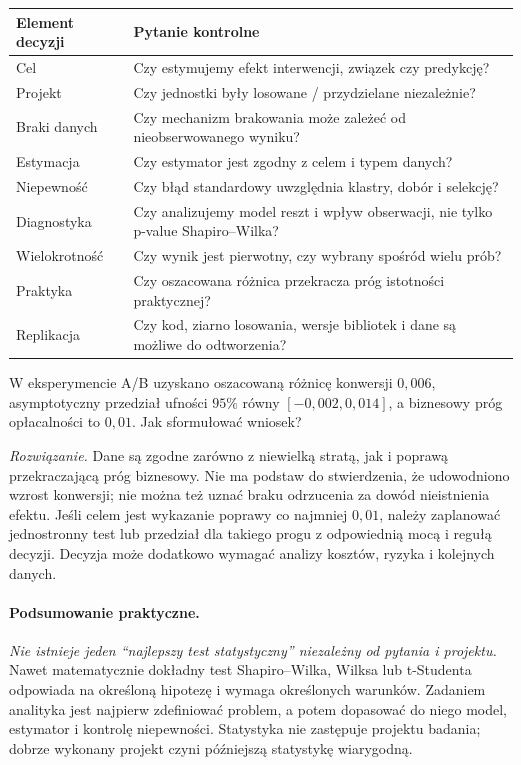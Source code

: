 \begin{center}\small
\begin{tabular}{>{\raggedright\arraybackslash}p{}>{\raggedright\arraybackslash}p{}}
\toprule
\textbf{Element decyzji} & \textbf{Pytanie kontrolne}\\
\midrule
Cel & Czy estymujemy efekt interwencji, związek czy predykcję?\\
Projekt & Czy jednostki były losowane / przydzielane niezależnie?\\
Braki danych & Czy mechanizm brakowania może zależeć od nieobserwowanego wyniku?\\
Estymacja & Czy estymator jest zgodny z celem i typem danych?\\
Niepewność & Czy błąd standardowy uwzględnia klastry, dobór i selekcję?\\
Diagnostyka & Czy analizujemy model reszt i wpływ obserwacji, nie tylko p-value Shapiro--Wilka?\\
Wielokrotność & Czy wynik jest pierwotny, czy wybrany spośród wielu prób?\\
Praktyka & Czy oszacowana różnica przekracza próg istotności praktycznej?\\
Replikacja & Czy kod, ziarno losowania, wersje bibliotek i dane są możliwe do odtworzenia?\\
\bottomrule
\end{tabular}
\end{center}

\begin{zadanie}
W eksperymencie A/B uzyskano oszacowaną różnicę konwersji $0{,}006$, asymptotyczny przedział ufności $95\%$ równy $[-0{,}002,0{,}014]$, a biznesowy próg opłacalności to $0{,}01$. Jak sformułować wniosek?\par
\emph{Rozwiązanie.} Dane są zgodne zarówno z niewielką stratą, jak i poprawą przekraczającą próg biznesowy. Nie ma podstaw do stwierdzenia, że udowodniono wzrost konwersji; nie można też uznać braku odrzucenia za dowód nieistnienia efektu. Jeśli celem jest wykazanie poprawy co najmniej $0{,}01$, należy zaplanować jednostronny test lub przedział dla takiego progu z odpowiednią mocą i regułą decyzji. Decyzja może dodatkowo wymagać analizy kosztów, ryzyka i kolejnych danych.
\end{zadanie}

\paragraph{Podsumowanie praktyczne.}
\emph{Nie istnieje jeden ``najlepszy test statystyczny'' niezależny od pytania i projektu.} Nawet matematycznie dokładny test Shapiro--Wilka, Wilksa lub t-Studenta odpowiada na określoną hipotezę i wymaga określonych warunków. Zadaniem analityka jest najpierw zdefiniować problem, a potem dopasować do niego model, estymator i kontrolę niepewności. Statystyka nie zastępuje projektu badania; dobrze wykonany projekt czyni późniejszą statystykę wiarygodną.

